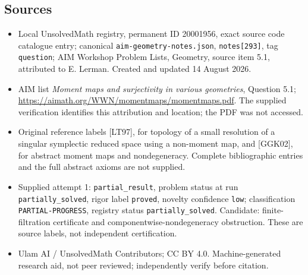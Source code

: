 \documentclass[11pt]{article}
\begin{document}
\subsection{Sources}
\begin{itemize}
\item Local UnsolvedMath registry, permanent ID 20001956, exact source code catalogue entry; canonical \texttt{aim-geometry-notes.json}, \texttt{notes[293]}, tag \texttt{question}; AIM Workshop Problem Lists, Geometry, source item 5.1, attributed to E. Lerman. Created and updated 14 August 2026.
\item AIM list \emph{Moment maps and surjectivity in various geometries}, Question 5.1; \url{https://aimath.org/WWN/momentmaps/momentmaps.pdf}. The supplied verification identifies this attribution and location; the PDF was not accessed.
\item Original reference labels [LT97], for topology of a small resolution of a singular symplectic reduced space using a non-moment map, and [GGK02], for abstract moment maps and nondegeneracy. Complete bibliographic entries and the full abstract axioms are not supplied.
\item Supplied attempt 1: \texttt{partial\_result}, problem status at run \texttt{partially\_solved}, rigor label \texttt{proved}, novelty confidence \texttt{low}; classification \texttt{PARTIAL-PROGRESS}, registry status \texttt{partially\_solved}. Candidate: finite-filtration certificate and componentwise-nondegeneracy obstruction. These are source labels, not independent certification.
\item Ulam AI / UnsolvedMath Contributors; CC BY 4.0. Machine-generated research aid, not peer reviewed; independently verify before citation.
\end{itemize}
\end{document}
